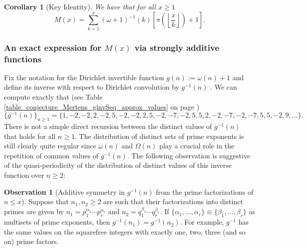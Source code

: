 \documentclass[11pt,reqno,a4letter]{article}
\numberwithin{figure}{section}
\numberwithin{table}{section}
\newcommand{\seqnum}[1]{\href{http://oeis.org/#1}{\color{ProcessBlue}{\underline{#1}}}}
\newcommand{\Floor}[2]{\ensuremath{\left\lfloor \frac{#1}{#2} \right\rfloor}}
\theoremstyle{plain}
\newtheorem{cor}[theorem]{Corollary}
\numberwithin{theorem}{section}
\theoremstyle{definition}
\newtheorem{observation}[theorem]{Observation}
\begin{document}
\begin{cor}[Key Identity] 
\label{cor_Mx_gInvnPixk_formula} 
We have that for all $x \geq 1$ 
\begin{equation} 
\label{eqn_Mx_gInvnPixk_formula} 
M(x) = \sum_{k=1}^{x} (\omega+1)^{-1}(k) \left[\pi\left(\Floor{x}{k}\right) + 1\right]. 
\end{equation} 
\end{cor} 

\subsubsection{An exact expression for $M(x)$ via strongly additive functions} 
\label{example_InvertingARecRelForMx_Intro}

Fix the notation for the Dirichlet invertible function $g(n) := \omega(n) + 1$ and define its 
inverse with respect to Dirichlet convolution by $g^{-1}(n)$ 
\cite[\seqnum{A341444}]{OEIS}. 
We can compute exactly that 
(see Table \ref{table_conjecture_Mertens_ginvSeq_approx_values} on page 
\pageref{table_conjecture_Mertens_ginvSeq_approx_values}) 
\[
\{g^{-1}(n)\}_{n \geq 1} = \{1, -2, -2, 2, -2, 5, -2, -2, 2, 5, -2, -7, -2, 5, 5, 2, -2, -7, -2, 
     -7, 5, 5, -2, 9, \ldots \}. 
\] 
There is not a simple 
direct recursion between the distinct values of $g^{-1}(n)$ that holds for all $n \geq 1$. 
The distribution of distinct sets of prime exponents is still clearly quite regular since 
$\omega(n)$ and $\Omega(n)$ play a crucial role in the repetition of common values of 
$g^{-1}(n)$. 
The following observation is suggestive of the quasi-periodicity of the distribution of 
distinct values of this inverse function over $n \geq 2$: 

\begin{observation}[Additive symmetry in $g^{-1}(n)$ from the prime factorizations of $n \leq x$] 
\label{heuristic_SymmetryIngInvFuncs} 
Suppose that $n_1, n_2 \geq 2$ are such that their factorizations into distinct primes are 
given by $n_1 = p_1^{\alpha_1} \cdots p_r^{\alpha_r}$ and $n_2 = q_1^{\beta_1} \cdots q_r^{\beta_r}$. 
If $\{\alpha_1, \ldots, \alpha_r\} \equiv \{\beta_1, \ldots, \beta_r\}$ as multisets of prime exponents, 
then $g^{-1}(n_1) = g^{-1}(n_2)$. For example, $g^{-1}$ has the same values on the squarefree integers 
with exactly one, two, three (and so on) prime factors. 
\end{observation} 
\end{document}
